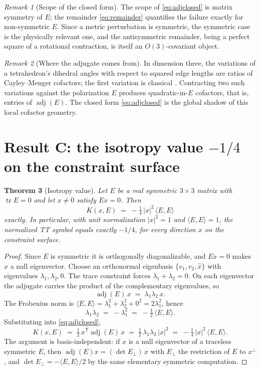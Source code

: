 \documentclass[11pt]{article}
\newtheorem{theorem}{Theorem}[section]
\theoremstyle{definition}
\theoremstyle{remark}
\newtheorem{remark}[theorem]{Remark}
\DeclareMathOperator{\adjE}{adj}
\DeclareMathOperator{\tr}{tr}
\newcommand{\trans}{\mathsf{T}}
\begin{document}
\begin{remark}[Scope of the closed form]
The scope of \eqref{eq:adjclosed} is matrix symmetry of $E$; the remainder \eqref{eq:remainder} quantifies the failure exactly for non-symmetric $E$. Since a metric perturbation is symmetric, the symmetric case is the physically relevant one, and the antisymmetric remainder, being a perfect square of a rotational contraction, is itself an $O(3)$-covariant object.
\end{remark}

\begin{remark}[Where the adjugate comes from]
In dimension three, the variations of a tetrahedron's dihedral angles with respect to squared edge lengths are ratios of Cayley--Menger cofactors; the first variation is classical \cite{CMS}. Contracting two such variations against the polarization $E$ produces quadratic-in-$E$ cofactors, that is, entries of $\adjE(E)$. The closed form \eqref{eq:adjclosed} is the global shadow of this local cofactor geometry.
\end{remark}

\section{Result C: the isotropy value $-1/4$ on the constraint surface}
\label{sec:isotropy}

\begin{theorem}[Isotropy value]
\label{thm:isotropy}
Let $E$ be a real symmetric $3\times3$ matrix with $\tr E = 0$ and let $x\neq 0$ satisfy $Ex = 0$. Then
\begin{equation}
K(x,E) \;=\; -\tfrac14\,|x|^{2}\,\langle E, E\rangle
\label{eq:isotropyexact}
\end{equation}
exactly. In particular, with unit normalization $|x|^2 = 1$ and $\langle E,E\rangle = 1$, the normalized TT symbol equals exactly $-1/4$, for every direction $x$ on the constraint surface.
\end{theorem}

\begin{proof}
Since $E$ is symmetric it is orthogonally diagonalizable, and $Ex = 0$ makes $x$ a null eigenvector. Choose an orthonormal eigenbasis $\{v_1, v_2, \hat x\}$ with eigenvalues $\lambda_1, \lambda_2, 0$. The trace constraint forces $\lambda_1 + \lambda_2 = 0$. On each eigenvector the adjugate carries the product of the complementary eigenvalues, so
\[
\adjE(E)\,x \;=\; \lambda_1\lambda_2\, x.
\]
The Frobenius norm is $\langle E,E\rangle = \lambda_1^2 + \lambda_2^2 + 0^2 = 2\lambda_1^2$, hence
\[
\lambda_1\lambda_2 \;=\; -\lambda_1^2 \;=\; -\tfrac12\,\langle E,E\rangle.
\]
Substituting into \eqref{eq:adjclosed},
\[
K(x,E) \;=\; \tfrac12\, x^{\trans}\adjE(E)\,x \;=\; \tfrac12\,\lambda_1\lambda_2\,|x|^2 \;=\; -\tfrac14\,|x|^{2}\,\langle E,E\rangle.
\]
The argument is basis-independent: if $x$ is a null eigenvector of a traceless symmetric $E$, then $\adjE(E)x = (\det E_\perp)\,x$ with $E_\perp$ the restriction of $E$ to $x^\perp$, and $\det E_\perp = -\langle E,E\rangle/2$ by the same elementary symmetric computation.
\end{proof}
\end{document}
